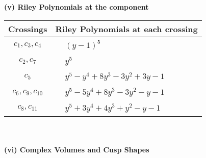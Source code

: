 \documentclass[1p]{elsarticle_modified}
\theoremstyle{definition}
\begin{document}
\newpage\renewcommand{\arraystretch}{1}
\flushleft \textbf{(v) Riley Polynomials at the component}\newline \\
\begin{tabular}{m{50pt}|m{274pt}}
Crossings & \hspace{64pt}Riley Polynomials at each crossing \\
\hline $$\begin{aligned}c_{1},c_{3},c_{4}\end{aligned}$$&$\begin{aligned}
&(y-1)^5
\end{aligned}$\\
\hline $$\begin{aligned}c_{2},c_{7}\end{aligned}$$&$\begin{aligned}
&y^5
\end{aligned}$\\
\hline $$\begin{aligned}c_{5}\end{aligned}$$&$\begin{aligned}
&y^5- y^4+8 y^3-3 y^2+3 y-1
\end{aligned}$\\
\hline $$\begin{aligned}c_{6},c_{9},c_{10}\end{aligned}$$&$\begin{aligned}
&y^5-5 y^4+8 y^3-3 y^2- y-1
\end{aligned}$\\
\hline $$\begin{aligned}c_{8},c_{11}\end{aligned}$$&$\begin{aligned}
&y^5+3 y^4+4 y^3+y^2- y-1
\end{aligned}$\\
\hline
\end{tabular}\\~\\
\newpage\flushleft \textbf{(vi) Complex Volumes and Cusp Shapes}
\end{document}
